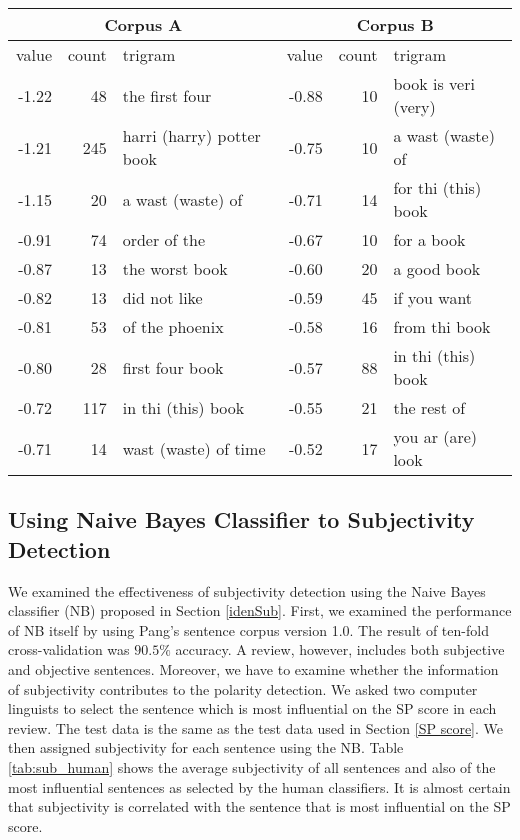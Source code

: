 \documentclass[japanese]{jnlp_1.3d}
\begin{document}
\begin{table}[t]
	\label{tab:feature_triw}
	  \begin{center}
  \begin{tabular}{|r|r|l|r|r|l|} \hline
 \multicolumn{3}{|c|}{Corpus A} &  \multicolumn{3}{|c|}{Corpus B} \\ \hline  
value & count & trigram & value & count & trigram \\ \hline
-1.22 & 48 & the first four & -0.88 & 10 & book is veri (very) \\
-1.21 & 245 & harri (harry) potter book & -0.75 & 10 & a wast (waste) of \\
-1.15 & 20 & a wast (waste) of & -0.71 & 14 & for thi (this) book \\ 
-0.91 & 74 & order of the & -0.67 & 10 & for a book \\ 
-0.87 & 13 & the worst book & -0.60 & 20 & a good book \\
-0.82 & 13 & did not like &  -0.59 & 45 & if you want \\  
-0.81 & 53 & of the phoenix & -0.58 & 16 & from thi book \\
-0.80 & 28 & first four book & -0.57 & 88 & in thi (this) book \\
-0.72 & 117 & in thi (this) book & -0.55 & 21 & the rest of \\
-0.71 & 14 & wast (waste) of time & -0.52 & 17 & you ar (are) look \\ 
 \hline
\end{tabular}
  \end{center}
\end{table}


\subsection{Using Naive Bayes Classifier to Subjectivity Detection}
We examined the effectiveness of subjectivity detection using the Naive Bayes classifier (NB) proposed in Section \ref{idenSub}. First, we examined the performance of NB itself by using Pang's sentence corpus version 1.0. The result of ten-fold cross-validation was $90.5\%$ accuracy. A review, however, includes both subjective and objective sentences. Moreover, we have to examine whether the information of subjectivity contributes to the polarity detection. We asked two computer linguists to select the sentence which is most influential on the SP score in each review. The test data is the same as the test data used in Section \ref{SP score}. We then assigned subjectivity for each sentence using the NB. Table \ref{tab:sub_human} shows the average subjectivity of all sentences and also of the most influential sentences as selected by the human classifiers. It is almost certain that subjectivity is correlated with the sentence that is most influential on the SP score.
\end{document}
